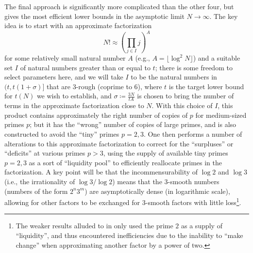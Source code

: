 \documentclass[12pt,a4paper,reqno]{amsart}
\numberwithin{equation}{section}
\theoremstyle{plain}
\theoremstyle{definition}
\begin{document}
The final approach is significantly more complicated than the other four, but gives the most efficient lower bounds in the asymptotic limit $N \to \infty$.  The key idea is to start with an approximate factorization
$$ N! \approx \left(\prod_{j \in I} j\right)^A$$
for some relatively small natural number $A$ (e.g., $A = \lfloor \log^2 N \rfloor$) and a suitable set $I$ of natural numbers greater than or equal to $t$; there is some freedom to select parameters here, and we will take $I$ to be the natural numbers in $(t, t(1+\sigma)]$ that are $3$-rough (coprime to $6$), where $t$ is the target lower bound for $t(N)$ we wish to establish, and $\sigma \coloneqq \frac{3N}{tA}$ is chosen to bring the number of terms in the approximate factorization close to $N$.  With this choice of $I$, this product contains approximately the right number of copies of $p$ for medium-sized primes $p$; but it has the ``wrong'' number of copies of large primes, and is also constructed to avoid the ``tiny'' primes $p=2,3$.  One then performs a number of alterations to this approximate factorization to correct for the ``surpluses'' or ``deficits'' at various primes $p>3$, using the supply of available tiny primes $p=2,3$ as a sort of ``liquidity pool'' to efficiently reallocate primes in the factorization.  A key point will be that the incommensurability of $\log 2$ and $\log 3$ (i.e., the irrationality of $\log 3/\log 2$) means that the $3$-smooth numbers (numbers of the form $2^n 3^m$) are asymptotically dense (in logarithmic scale), allowing for other factors to be exchanged for $3$-smooth factors with little loss\footnote{The weaker results alluded to in  only used the prime $2$ as a supply of ``liquidity'', and thus encountered inefficiencies due to the inability to ``make change'' when approximating another factor by a power of two.}.
\end{document}
